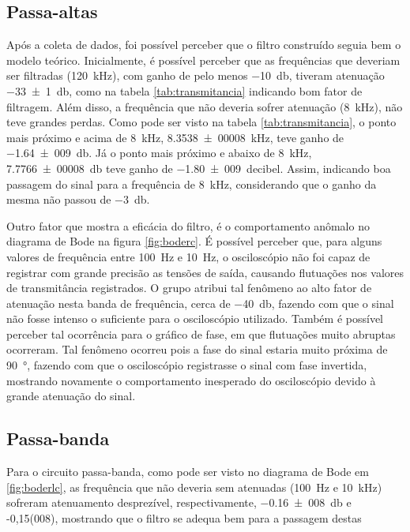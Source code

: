\subsection{Passa-altas}

  Após a coleta de dados, foi possível perceber que o filtro construído seguia bem o modelo teórico. Inicialmente, é possível perceber que as frequências que deveriam ser filtradas (\SI{120}{\kilo\hertz}), com ganho de pelo menos \SI{-10}{\decibel}, tiveram atenuação \SI{-33(1)}{\decibel}, como na tabela \ref{tab:transmitancia} indicando bom fator de filtragem. Além disso, a frequência que não deveria sofrer atenuação (\SI{8}{\kilo\hertz}), não teve grandes perdas. Como pode ser visto na tabela \ref{tab:transmitancia}, o ponto mais próximo e acima de \SI{8}{\kilo\hertz}, \SI{8,3538(00008)}{\kilo\hertz}, teve ganho de \SI{-1,64(009)}{\decibel}. Já o ponto mais próximo e abaixo de \SI{8}{\kilo\hertz}, \SI{7,7766(00008)}{\decibel} teve ganho de \SI{-1,80(009)}{decibel}. Assim, indicando boa passagem do sinal para a frequência de \SI{8}{\kilo\hertz}, considerando que o ganho da mesma não passou de \SI{-3}{\decibel}.\par
  Outro fator que mostra a eficácia do filtro, é o comportamento anômalo no diagrama de Bode na figura \ref{fig:boderc}. É possível perceber que, para alguns valores de frequência entre \SI{100}{\hertz} e \SI{10}{\hertz}, o osciloscópio não foi capaz de registrar com grande precisão as tensões de saída, causando flutuações nos valores de transmitância registrados. O grupo atribui tal fenômeno ao alto fator de atenuação nesta banda de frequência, cerca de \SI{-40}{\decibel}, fazendo com que o sinal não fosse intenso o suficiente para o osciloscópio utilizado. Também é possível perceber tal ocorrência para o gráfico de fase, em que flutuações muito abruptas ocorreram. Tal fenômeno ocorreu pois a fase do sinal estaria muito próxima de \SI{90}{\degree}, fazendo com que o osciloscópio registrasse o sinal com fase invertida, mostrando novamente o comportamento inesperado do osciloscópio devido à grande atenuação do sinal.

\subsection{Passa-banda}
  
  Para o circuito passa-banda, como pode ser visto no diagrama de Bode em \ref{fig:boderlc}, as frequência que não deveria sem atenuadas (\SI{100}{\hertz} e \SI{10}{\kilo\hertz}) sofreram atenuamento desprezível, respectivamente, \SI{-0,16(008)}{\decibel} e {-0,15(008)}{\decibel}, mostrando que o filtro se adequa bem para a passagem destas 
